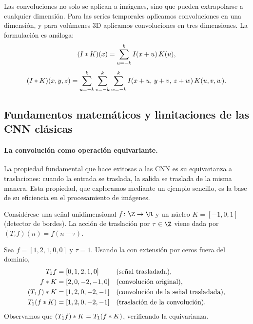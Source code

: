 Las convoluciones no solo se aplican a im\'agenes, sino que pueden extrapolarse
a cualquier dimensi\'on. Para las series temporales aplicamos convoluciones en
una dimensi\'on, y para vol\'umenes 3D aplicamos convoluciones en tres
dimensiones. La formulaci\'on es an\'aloga:
\begin{equation}
  (I * K)(x) = \sum_{u=-k}^{k} I(x+u)\, K(u),
  \label{eq:grids:convolution1d}
\end{equation}
\begin{equation}
  (I * K)(x,y,z) = \sum_{u=-k}^{k}\sum_{v=-k}^{k}\sum_{w=-k}^{k}
    I(x+u,\, y+v,\, z+w)\, K(u,v,w).
  \label{eq:grids:convolution3d}
\end{equation}

\subsection{Fundamentos matem\'aticos y limitaciones de las CNN cl\'asicas}
\label{sec:grids:foundations-limits}

\paragraph{La convoluci\'on como operaci\'on equivariante.}
La propiedad fundamental que hace exitosas a las CNN es su equivarianza a
traslaciones: cuando la entrada se traslada, la salida se traslada de la misma
manera. Esta propiedad, que exploramos mediante un ejemplo sencillo, es la base
de su eficiencia en el procesamiento de im\'agenes.

\begin{example}
\label{ex:grids:equiv-1d}
Consid\'erese una se\~nal unidimensional $f \colon \Z \to \R$ y un n\'ucleo
$K = [-1, 0, 1]$ (detector de bordes). La acci\'on de traslaci\'on por
$\tau \in \Z$ viene dada por $(T_\tau f)(n) = f(n - \tau)$.

Sea $f = [1, 2, 1, 0, 0]$ y $\tau = 1$. Usando la
 con extensi\'on por ceros fuera del dominio,
\begin{align}
T_1 f &= [0, 1, 2, 1, 0] && \text{(se\~nal trasladada)}, \\
f * K &= [2, 0, -2, -1, 0] && \text{(convoluci\'on original)}, \\
(T_1 f) * K &= [1, 2, 0, -2, -1] && \text{(convoluci\'on de la se\~nal trasladada)}, \\
T_1(f * K) &= [1, 2, 0, -2, -1] && \text{(traslaci\'on de la convoluci\'on)}.
\end{align}
Observamos que $(T_1 f) * K = T_1(f * K)$, verificando la equivarianza.
\end{example}


